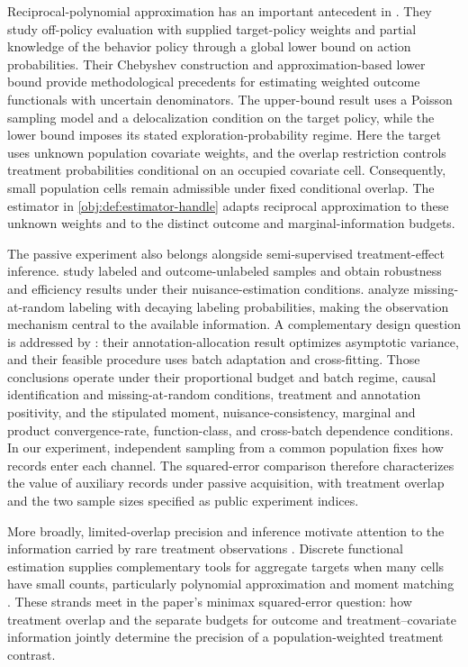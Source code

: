 \documentclass[11pt]{article}
\begin{document}
Reciprocal-polynomial approximation has an important antecedent in \citet[Section 3.3, Theorems 5--6]{MaZhuJiaoWainwright2022OPE}. They study off-policy evaluation with supplied target-policy weights and partial knowledge of the behavior policy through a global lower bound on action probabilities. Their Chebyshev construction and approximation-based lower bound provide methodological precedents for estimating weighted outcome functionals with uncertain denominators. The upper-bound result uses a Poisson sampling model and a delocalization condition on the target policy, while the lower bound imposes its stated exploration-probability regime. Here the target uses unknown population covariate weights, and the overlap restriction controls treatment probabilities conditional on an occupied covariate cell. Consequently, small population cells remain admissible under fixed conditional overlap. The estimator in \cref{obj:def:estimator-handle} adapts reciprocal approximation to these unknown weights and to the distinct outcome and marginal-information budgets.

The passive experiment also belongs alongside semi-supervised treatment-effect inference. \citet[Theorem 2.1 and Corollary 2.1]{ChakraborttyDai2024Semisupervised} study labeled and outcome-unlabeled samples and obtain robustness and efficiency results under their nuisance-estimation conditions. \citet[Theorems 3.7, 3.13, and 5.1]{ZhangChakraborttyBradic2023DecayingOverlap} analyze missing-at-random labeling with decaying labeling probabilities, making the observation mechanism central to the available information. A complementary design question is addressed by \citet[Theorems 4.2 and 5.1 of the arXiv manuscript]{NwankwoGoldkindZhou2026Annotations}: their annotation-allocation result optimizes asymptotic variance, and their feasible procedure uses batch adaptation and cross-fitting. Those conclusions operate under their proportional budget and batch regime, causal identification and missing-at-random conditions, treatment and annotation positivity, and the stipulated moment, nuisance-consistency, marginal and product convergence-rate, function-class, and cross-batch dependence conditions. In our experiment, independent sampling from a common population fixes how records enter each channel. The squared-error comparison therefore characterizes the value of auxiliary records under passive acquisition, with treatment overlap and the two sample sizes specified as public experiment indices.

More broadly, limited-overlap precision and inference motivate attention to the information carried by rare treatment observations \citep{Rothe2017LimitedOverlap,ArmstrongKolesar2021ATEInference,MaWang2020RobustIPW}. Discrete functional estimation supplies complementary tools for aggregate targets when many cells have small counts, particularly polynomial approximation and moment matching \citep{JiaoVenkatHanWeissman2015Functionals,WuYang2016Entropy}. These strands meet in the paper's minimax squared-error question: how treatment overlap and the separate budgets for outcome and treatment--covariate information jointly determine the precision of a population-weighted treatment contrast.
\end{document}
